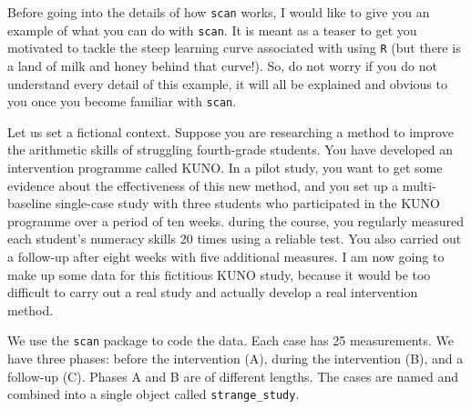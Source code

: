 \documentclass[
  letterpaper,
  DIV=11,
  numbers=noendperiod]{scrreprt}
\begin{document}
Before going into the details of how \texttt{scan} works, I would like
to give you an example of what you can do with \texttt{scan}. It is
meant as a teaser to get you motivated to tackle the steep learning
curve associated with using \texttt{R} (but there is a land of milk and
honey behind that curve!). So, do not worry if you do not understand
every detail of this example, it will all be explained and obvious to
you once you become familiar with \texttt{scan}.

Let us set a fictional context. Suppose you are researching a method to
improve the arithmetic skills of struggling fourth-grade students. You
have developed an intervention programme called KUNO. In a pilot study,
you want to get some evidence about the effectiveness of this new
method, and you set up a multi-baseline single-case study with three
students who participated in the KUNO programme over a period of ten
weeks. during the course, you regularly measured each student's numeracy
skills 20 times using a reliable test. You also carried out a follow-up
after eight weeks with five additional measures. I am now going to make
up some data for this fictitious KUNO study, because it would be too
difficult to carry out a real study and actually develop a real
intervention method.

We use the \texttt{scan} package to code the data. Each case has 25
measurements. We have three phases: before the intervention (A), during
the intervention (B), and a follow-up (C). Phases A and B are of
different lengths. The cases are named and combined into a single object
called \texttt{strange\_study}.
\end{document}

